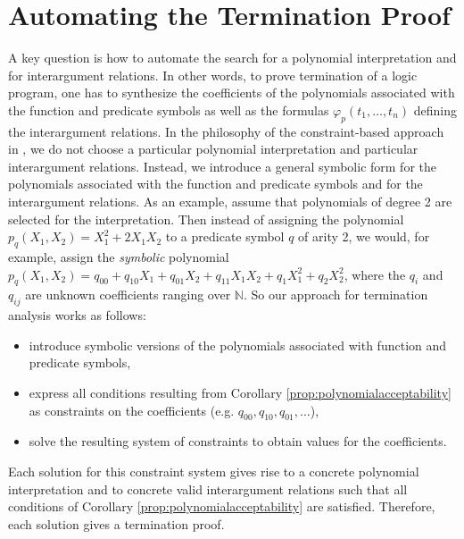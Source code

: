 \documentclass[envcountsame]{tlp}
\newcounter{ex:der-lastsymconsctr}
\begin{document}
\section{Automating the Termination Proof}
\label{sec:automation}

A key question is how to automate the search for a polynomial interpretation
and for interargument relations. In other words, to prove
termination of a logic program, one has to synthesize the coefficients of the polynomials
associated with the function and predicate symbols as well as the formulas
$\varphi_p(t_1,\ldots,t_n)$ defining the 
interargument relations.
In the philosophy of the constraint-based approach in
\cite{Decorteetal98}, we do not choose a particular polynomial interpretation
and particular interargument relations. Instead, we introduce a general symbolic form
for the polynomials associated with the function and predicate symbols and for
the interargument relations. As 
an example,  assume that polynomials of degree 2 are selected for the
interpretation. Then instead of assigning the polynomial $p_q(X_1,X_2) =
 X_1^2 + 2 X_1 X_2$ to a predicate symbol $q$ of arity 2, we would, for example, assign
the \emph{symbolic} polynomial $p_q(X_1,X_2) = q_{00} + q_{10} X_1 + q_{01}
X_2 
+ q_{11} X_1 X_2 + q_1 X_1^2 + q_2 X_2^2$,
where the $q_i$ and $q_{ij}$ 
are unknown coefficients ranging
over $\mathbb{N}$. So our approach for termination analysis works as follows:
\begin{itemize}
\item   introduce symbolic versions of the 
polynomials associated with function and predicate symbols, 
\item   express all conditions resulting from Corollary
\ref{prop:polynomialacceptability} as constraints on the coefficients
(e.g. $q_{00}, q_{10}, q_{01}, \ldots$), 
\item   solve the resulting system of constraints to obtain values for the coefficients.
\end{itemize}
Each solution for this constraint system gives rise to a concrete polynomial
interpretation and to concrete valid interargument
relations such that all conditions of 
Corollary
\ref{prop:polynomialacceptability} are satisfied. 
Therefore, each solution gives a termination proof. 
\end{document}
